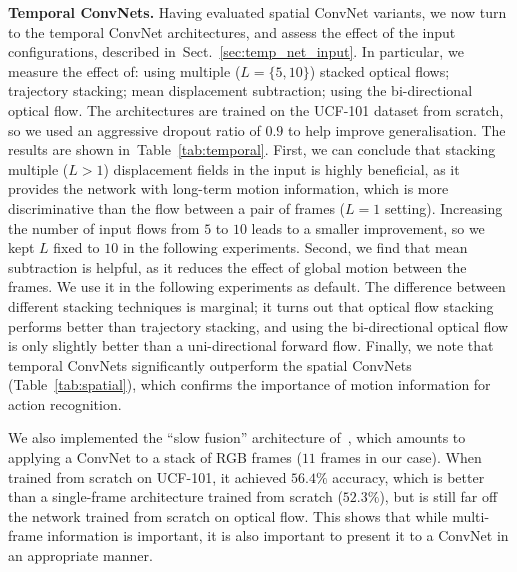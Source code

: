 \documentclass{article} %
\newcommand{\tblref}[1]{Table~\ref{#1}}
\newcommand{\sref}[1]{Sect.~\ref{#1}}
\begin{document}
\noindent\textbf{Temporal ConvNets.}
Having evaluated spatial ConvNet variants, we now turn to the temporal ConvNet architectures, and assess the effect of the input configurations, described in~\sref{sec:temp_net_input}.
In particular, we measure the effect of: using multiple ($L=\{5,10\}$) stacked optical flows; trajectory stacking; mean displacement subtraction; using the bi-directional optical flow.
The architectures are trained on the UCF-101 dataset from scratch, so we used an aggressive dropout ratio of $0.9$ to help improve generalisation. 
The results are shown in~\tblref{tab:temporal}.
First, we can conclude that stacking multiple ($L>1$) displacement fields in the input is highly beneficial, as it provides the network with long-term motion information, which is more discriminative 
than the flow between a pair of frames ($L=1$ setting). Increasing the number of input flows from $5$ to $10$ leads to a smaller improvement, so we kept $L$ fixed to $10$ in the following experiments.
Second, we find that mean subtraction is helpful, as it reduces the effect of global motion between the frames. We use it in the following experiments as default.
The difference between different stacking techniques is marginal; it turns out that optical flow stacking performs better than trajectory stacking,
and using the bi-directional optical flow is only slightly better than a uni-directional forward flow.
Finally, we note that temporal ConvNets significantly outperform the spatial ConvNets (\tblref{tab:spatial}), which confirms the importance of motion information for action recognition.

We also implemented the ``slow fusion'' architecture of~\cite{Karpathy14}, which amounts to applying a \mbox{ConvNet} to a stack of RGB frames ($11$ frames in our case).
When trained from scratch on UCF-101, it achieved $56.4\%$ accuracy, which is better than a single-frame architecture trained from scratch ($52.3\%$), but is still far off the network 
trained from scratch on optical flow. This shows that while multi-frame information is important, it is also important to present it to a ConvNet in an appropriate manner.
\end{document}
